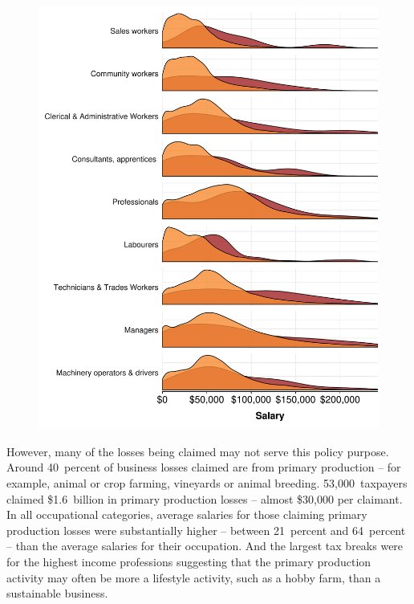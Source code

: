 \documentclass{grattan}\usepackage[]{graphicx}\usepackage[]{color}
\begin{document}
\begin{figure}
\includegraphics[width=\columnwidth]{CGT-NG-atlas//density-salary-by-PP-losses-1}
\end{figure}

However, many of the losses being claimed may not serve this policy purpose. Around 40~percent of business losses claimed are from primary production -- for example, animal or crop farming, vineyards or animal breeding. 53,000~taxpayers claimed \$1.6~billion  in primary production losses -- almost \$30,000 per claimant. In all occupational categories, average salaries for those claiming primary production losses were substantially higher -- between 21~percent and 64~percent -- than the average salaries for their occupation. And the largest tax breaks were for the highest income professions  suggesting that the primary production activity may often be more a lifestyle activity, such as a hobby farm, than a sustainable business. 
\end{document}
